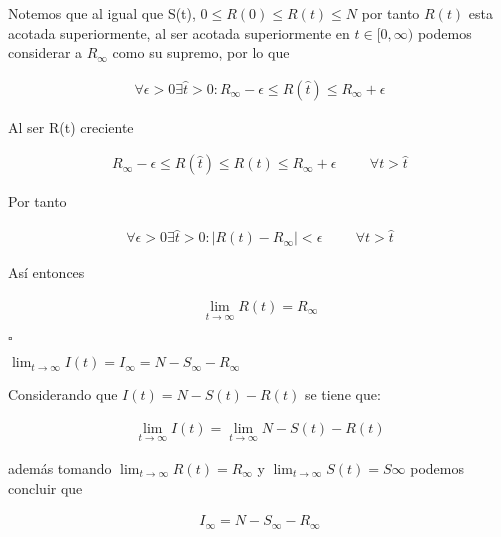 \begin{Dem}
Notemos que al igual que S(t), $0 \leq R(0) \leq R(t) \leq N$ por tanto  $R(t)$ esta acotada superiormente, al ser acotada superiormente en $t \in [0, \infty)$ podemos considerar a $R_{\infty}$ como su supremo, por lo que
 
 \begin{align*}
\forall \epsilon >0  \exists \hat{t} > 0 : R_{\infty} - \epsilon \leq R(\hat{t}) \leq R_{\infty} +  \epsilon
 \end{align*}
 
Al ser R(t) creciente 

\begin{align*}
R_{\infty} - \epsilon \leq R(\hat{t}) \leq R(t) \leq R_{\infty} +  \epsilon  \hspace{1cm} \forall t  > \hat{t} 
\end{align*}

Por tanto 

\begin{align*}
\forall \epsilon > 0  \exists \hat{t} > 0 : |R(t) -  R_{\infty}| <  \epsilon \hspace{1cm} \forall t  > \hat{t} 
\end{align*}

Así entonces

\begin{align*}
\lim_{t \to \infty} R(t) = R_{\infty}
\end{align*}

\end{Dem}

\hfill	$\square$

\begin{Af}
$\lim_{t \to \infty} I(t) = I_{\infty} = N - S_{\infty} - R_{\infty}$
\end{Af}

\begin{Dem}

Considerando que $I (t) = N - S(t) - R(t)$ se tiene que: 

\begin{align*}
\lim_{t \to \infty} I(t)  = \lim_{t \to \infty}  N - S (t) - R(t) 
\end{align*}

además tomando $\lim_{t \to \infty} R(t) = R_{\infty}$ y $\lim_{t \to \infty} S(t) = S{\infty}$ podemos concluir que 

\begin{align*}
 I_{\infty}  = N - S_{\infty} - R_{\infty}
\end{align*}

\end{Dem}


